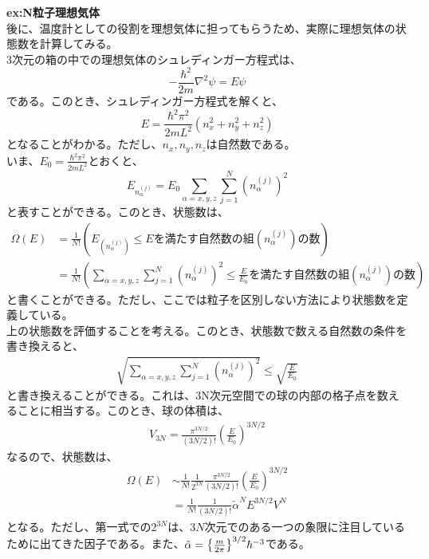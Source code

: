 \documentclass[a4paper,11pt]{jsarticle}
\numberwithin{equation}{section}
\begin{document}
\textbf{ex:N粒子理想気体}\\
後に、温度計としての役割を理想気体に担ってもらうため、実際に理想気体の状態数を計算してみる。\\
3次元の箱の中での理想気体のシュレディンガー方程式は、
\begin{equation}
  -\frac{\hbar^2}{2m}\nabla^2 \psi = E \psi
\end{equation}
である。このとき、シュレディンガー方程式を解くと、
\begin{equation}
  E = \frac{\hbar^2 \pi^2}{2mL^2}(n_x^2+n_y^2+n_z^2)
\end{equation}
となることがわかる。ただし、$n_x,n_y,n_z$は自然数である。\\
いま、$E_0 = \frac{\hbar^2 \pi^2}{2mL^2}$とおくと、
\begin{equation}
  E_{n_{\alpha}^{(j)}} = E_0 \sum_{\alpha = x,y,z} \sum_{j=1}^{N} (n_{\alpha}^{(j)})^2
\end{equation}
と表すことができる。このとき、状態数は、
\begin{align}
  \Omega(E) &= \frac{1}{N!} (E_{(n_{\alpha}^{(j)})} \leq E \text{を満たす自然数の組}(n_{\alpha}^{(j)})\text{の数})\\
  &= \frac{1}{N!} (\sum_{\alpha = x,y,z} \sum_{j=1}^{N} (n_{\alpha}^{(j)})^2 \leq \frac{E}{E_0} \text{を満たす自然数の組}(n_{\alpha}^{(j)})\text{の数})
\end{align}
と書くことができる。ただし、ここでは粒子を区別しない方法により状態数を定義している。\\
上の状態数を評価することを考える。このとき、状態数で数える自然数の条件を書き換えると、
\begin{align}
  \sqrt{\sum_{\alpha = x,y,z} \sum_{j=1}^{N} (n_{\alpha}^{(j)})^2} \leq \sqrt{\frac{E}{E_0}}
\end{align}
と書き換えることができる。これは、3N次元空間での球の内部の格子点を数えることに相当する。このとき、球の体積は、
\begin{align}
  V_{3N} = \frac{\pi^{3N/2}}{(3N/2)!}(\frac{E}{E_0})^{3N/2}
\end{align}
なるので、状態数は、
\begin{align}
  \Omega(E) &\sim \frac{1}{N!} \frac{1}{2^{3N}} \frac{\pi^{3N/2}}{(3N/2)!}(\frac{E}{E_0})^{3N/2}\\
  &= \frac{1}{N!} \frac{1}{(3N/2)!}\tilde{\alpha}^N E^{3N/2}V^{N} \label{eq:idealgas}
\end{align}
となる。ただし、第一式での$2^{3N}$は、$3N$次元でのある一つの象限に注目しているために出てきた因子である。また、$\tilde{\alpha}= \qty{\frac{m}{2\pi}}^{3/2}\hbar^{-3}$である。\\
\end{document}
